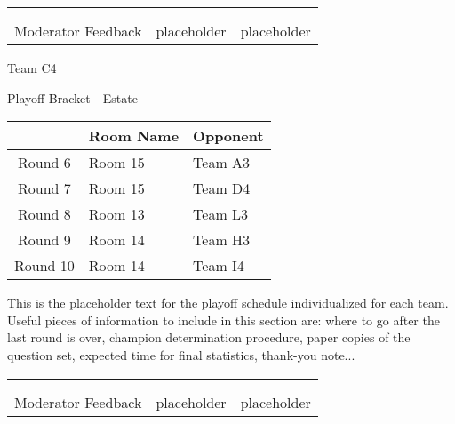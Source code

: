\documentclass{article}%
\begin{document}
\newline%
%
\begin{tabularx}{\textwidth}{YYY}%
  &  &  \\%
\\%
Moderator Feedback&placeholder&placeholder\\%
\end{tabularx}%
\newpage%
\begin{center}%
\begin{Huge}%
Team C4%
\end{Huge}%
\vspace*{12pt}%
\linebreak%
\begin{Large}%
Playoff Bracket {-} Estate%
\end{Large}%
\end{center}%
\vspace*{4pt}%
%
\begin{tabularx}{\textwidth}{|c|Y|Y|}%
\hline%
&Room Name&Opponent\\%
\hline%
Round 6&Room 15&Team A3\\%
Round 7&Room 15&Team D4\\%
Round 8&Room 13&Team L3\\%
Round 9&Room 14&Team H3\\%
Round 10&Room 14&Team I4\\%
\hline%
\end{tabularx}%
\vspace*{30pt}%
\linebreak%
This is the placeholder text for the playoff schedule individualized for each team. Useful pieces of information to include in this section are: where to go after the last round is over, champion determination procedure, paper copies of the question set, expected time for final statistics, thank{-}you note...%
\vspace*{30pt}%
\newline%
%
\begin{tabularx}{\textwidth}{YYY}%
  &  &  \\%
\\%
Moderator Feedback&placeholder&placeholder\\%
\end{tabularx}%
\end{document}
